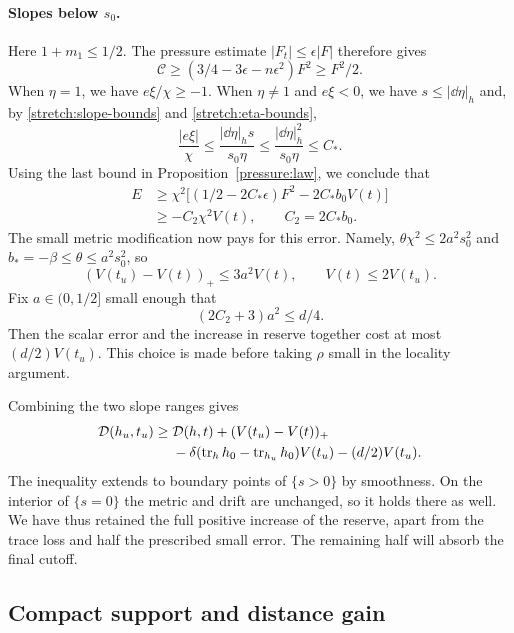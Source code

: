 \paragraph{Slopes below $s_0$.}
Here $1+m_1\le1/2$.  The pressure estimate $|F_t|\le\epsilon|F|$
therefore gives
\[
 \mathcal C\ge(3/4-3\epsilon-n\epsilon^2)F^2\ge F^2/2.
\]
When $\eta=1$, we have $e\xi/\chi\ge-1$.  When $\eta\ne1$ and
$e\xi<0$, we have $s\le|\dd\eta|_h$ and, by
\eqref{stretch:slope-bounds} and \eqref{stretch:eta-bounds},
\[
 \frac{|e\xi|}{\chi}
 \le\frac{|\dd\eta|_h s}{s_0\eta}
 \le\frac{|\dd\eta|_h^2}{s_0\eta}\le C_*.
\]
Using the last bound in Proposition~\ref{pressure:law}, we conclude that
\begin{align*}
 E&\ge\chi^2\bigl[(1/2-2C_*\epsilon)F^2-2C_*b_0V(t)\bigr]\\
  &\ge-C_2\chi^2V(t),\qquad C_2=2C_*b_0.
\end{align*}
The small metric modification now pays for this error.  Namely,
$\theta\chi^2\le2a^2s_0^2$ and
$b_*=-\beta\le\theta\le a^2s_0^2$, so
\[
 (V(t_u)-V(t))_+\le3a^2V(t),
                 \qquad V(t)\le2V(t_u).
\]
Fix $a\in(0,1/2]$ small enough that
\begin{equation}\label{stretch:a-choice}
 (2C_2+3)a^2\le d/4.
\end{equation}
Then the scalar error and the increase in reserve together cost at most
$(d/2)V(t_u)$.  This choice is made before taking $\rho$ small in the
locality argument.

Combining the two slope ranges gives
\begin{equation}\label{stretch:raw-estimate}
 \begin{split}
 \mathcal D(h_u,t_u)\ge{}&\mathcal D(h,t)+(V(t_u)-V(t))_+\\
 &-\delta(\operatorname{tr}_hh_0-\operatorname{tr}_{h_u}h_0)V(t_u)
                              -(d/2)V(t_u).
 \end{split}
\end{equation}
The inequality extends to boundary points of $\{s>0\}$ by smoothness.
On the interior of $\{s=0\}$ the metric and drift are unchanged, so it
holds there as well.  We have thus retained the full positive increase
of the reserve, apart from the trace loss and half the prescribed small
error.  The remaining half will absorb the final cutoff.

\subsection{Compact support and distance gain}
\label{stretch:finish}

